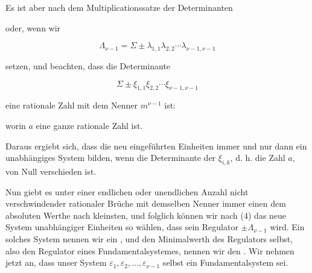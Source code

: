 Es ist aber nach dem Multiplicationssatze der Determinanten


oder, wenn wir

\[
\Lambda_{\nu-1} = \Sigma \pm \lambda_{1,1}\lambda_{2,2} \cdots \lambda_{\nu-1,\nu-1}
\]

setzen, und beachten, dass die Determinante

\[
\Sigma \pm \xi_{1,1}\xi_{2,2} \cdots \xi_{\nu-1,\nu-1}
\]

eine rationale Zahl mit dem Nenner $m^{\nu-1}$ ist:


worin $a$ eine ganze rationale Zahl ist.

Daraus ergiebt sich, dass die neu eingeführten Einheiten
immer und nur dann ein unabhängiges System bilden, wenn die
Determinante der $\xi_{i,k}$, d. h. die Zahl $a$, von Null verschieden ist.

Nun giebt es unter einer endlichen oder unendlichen Anzahl
nicht verschwindender rationaler Brüche mit demselben Nenner
immer einen dem absoluten Werthe nach kleinsten, und folglich
können wir nach (4) das neue System unabhängiger Einheiten
so wählen, dass sein Regulator $\pm \Lambda_{\nu-1}$ 
wird. Ein solches System nennen wir ein , und den Minimalwerth des Regulators selbst,
also den Regulator eines Fundamentalsystemes, nennen wir den
. Wir nehmen jetzt an, dass unser
System $\varepsilon_1, \varepsilon_2, \ldots, \varepsilon_{\nu-1}$ selbst ein Fundamentalsystem sei.


